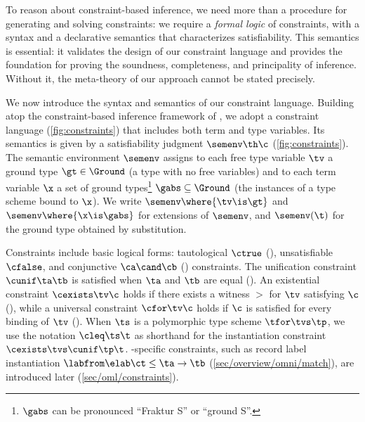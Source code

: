 \documentclass[acmsmall,screen,nonacm%
\Anonymous{,anonymous}{}%
\Final{}{,review}%
]{acmart}
\newcommand{\BBemlti}{Pottier-Remy/emlti} %
\providecommand{\DIFaddbegin}{} %
\providecommand{\DIFaddend}{} %
\providecommand{\DIFdelbegin}{} %
\providecommand{\DIFdelend}{} %
\begin{document}

To reason about constraint-based inference, we need more than a procedure for
generating and solving constraints: we require a \emph{formal logic} of
constraints, with a syntax and a declarative semantics that characterizes
satisfiability. This semantics is essential: it validates the design of our
constraint language and provides the foundation for proving the soundness,
completeness, and principality of inference. Without it, the meta-theory of our
approach cannot be stated precisely.


We now introduce the syntax and semantics of our constraint language.
Building atop the constraint-based inference framework of
\DIFdelbegin %
\DIFdelend \DIFaddbegin \citet*{\BBemlti}\DIFaddend , we adopt a constraint language
(\cref{fig:constraints}) that includes both term and type variables. Its
semantics is given by a satisfiability judgment $\semenv \th \c$
(\cref{fig:constraints}). The semantic environment $\semenv$ assigns to each
free type variable $\tv$ a ground type $\gt \in \Ground$ (a type with no
free variables) and to each term variable $\x$ a set of ground
types\footnote {$\gabs$ can be pronounced ``Fraktur S'' or ``ground S''.}
$\gabs \subseteq \Ground$ (the instances of a type scheme bound to
$\x$).
%
We write $\semenv\where{\tv \is \gt}$ and $\semenv\where{\x \is \gabs}$ for
extensions of $\semenv$, and $\semenv(\t)$ for the ground type obtained by
substitution.



Constraints include basic logical forms: tautological $\ctrue$ (),
unsatisfiable $\cfalse$, and conjunctive $\ca \cand \cb$ ()
constraints. The unification constraint $\cunif \ta \tb$ is satisfied when
$\ta$ and $\tb$ are equal ().
%
An existential constraint $\cexists \tv \c$ holds if there exists a witness
$\gt$ for $\tv$ satisfying $\c$ (), while a universal constraint
$\cfor \tv \c$ holds if $\c$ is satisfied for every binding of $\tv$
().
%
When $\ts$ is a polymorphic type scheme $\tfor \tvs \tp$, we use the notation
$\cleq \ts \t$ as shorthand for the instantiation constraint $\cexists
\tvs \cunif \tp \t$. \OML-specific constraints, such as record label
instantiation $\labfrom \elab \ct \leq \ta \to \tb$
(\cref{sec/overview/omni/match}), are introduced later (\cref{sec/oml/constraints}).
\end{document}
